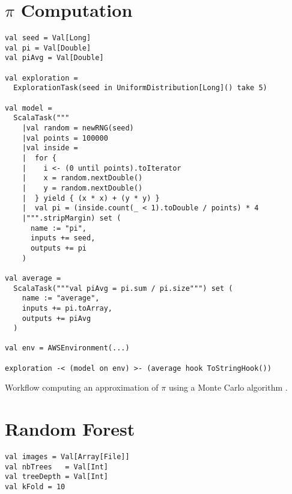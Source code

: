 \begin{appendices}

\chapter{$\pi$ Computation} \label{Pi}

\begin{listing}[h]
	\centering
	\begin{minipage}{10.5cm}
		\begin{verbatim}
val seed = Val[Long]
val pi = Val[Double]
val piAvg = Val[Double]

val exploration =
  ExplorationTask(seed in UniformDistribution[Long]() take 5)

val model =
  ScalaTask("""
    |val random = newRNG(seed)
    |val points = 100000
    |val inside = 
    |  for {
    |    i <- (0 until points).toIterator
    |    x = random.nextDouble()
    |    y = random.nextDouble()
    |  } yield { (x * x) + (y * y) }
    |  val pi = (inside.count(_ < 1).toDouble / points) * 4
    |""".stripMargin) set (
      name := "pi",
      inputs += seed,
      outputs += pi
    )
    
val average = 
  ScalaTask("""val piAvg = pi.sum / pi.size""") set (
    name := "average",
    inputs += pi.toArray,
    outputs += piAvg
  )
  
val env = AWSEnvironment(...)

exploration -< (model on env) >- (average hook ToStringHook())
		\end{verbatim}
	\end{minipage}
	\caption{Workflow computing an approximation of $\pi$ using a Monte Carlo algorithm \cite{OpenMOLEMarketplace}.}
	\label{PiComputation}
\end{listing}

\chapter{Random Forest} \label{Forest}

\begin{listing}[h]
	\centering
	\begin{minipage}{13.8cm}
		\begin{verbatim}
val images = Val[Array[File]]
val nbTrees   = Val[Int]
val treeDepth = Val[Int]
val kFold = 10


\end{verbatim}
\end{minipage}
\end{listing}
\end{appendices}
